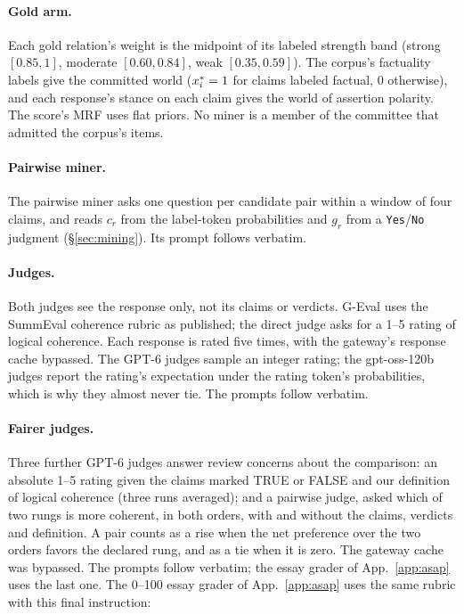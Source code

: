 \paragraph{Gold arm.} Each gold relation's weight is the midpoint of its labeled strength band
(strong $[0.85,1]$, moderate $[0.60,0.84]$, weak $[0.35,0.59]$). The corpus's factuality labels give
the committed world ($x^{\ast}_i=1$ for claims labeled factual, $0$ otherwise), and each response's
stance on each claim gives the world of assertion polarity. The score's MRF uses flat priors. No miner is a member of the committee that admitted
the corpus's items.

\paragraph{Pairwise miner.} The pairwise miner asks one question per candidate pair within a window
of four claims, and reads $c_r$ from the label-token probabilities and $g_r$ from a
\texttt{Yes}/\texttt{No} judgment (\S\ref{sec:mining}). Its prompt follows verbatim.

\paragraph{Judges.} Both judges see the response only, not its claims or verdicts. G-Eval uses the
SummEval coherence rubric as published; the direct judge asks for a 1--5 rating of logical
coherence. Each response is rated five times, with the gateway's response cache bypassed. The
GPT-6 judges sample an integer rating; the gpt-oss-120b judges report the rating's expectation under
the rating token's probabilities, which is why they almost never tie. The prompts follow verbatim.

\paragraph{Fairer judges.} Three further GPT-6 judges answer review concerns about the comparison:
an absolute 1--5 rating given the claims marked TRUE or FALSE and our definition of logical
coherence (three runs averaged); and a pairwise judge, asked which of two rungs is more coherent,
in both orders, with and without the claims, verdicts and definition. A pair counts as a rise when
the net preference over the two orders favors the declared rung, and as a tie when it is zero. The
gateway cache was bypassed. The prompts follow verbatim; the essay grader of App.~\ref{app:asap}
uses the last one.
The 0--100 essay grader of App.~\ref{app:asap} uses the same rubric with this final instruction:

